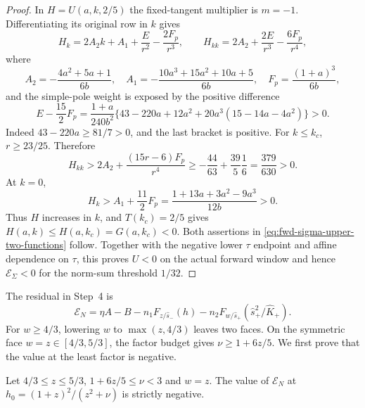 \begin{proof}
In $H=U(a,k,2/5)$ the fixed-tangent multiplier is $m=-1$.
Differentiating its original row in $k$ gives
\[
 H_k=2A_2k+A_1+\frac E{r^2}-\frac{2F_p}{r^3},\qquad
 H_{kk}=2A_2+\frac{2E}{r^3}-\frac{6F_p}{r^4},
\]
where
\[
 A_2=-\frac{4a^2+5a+1}{6b},\quad
 A_1=-\frac{10a^3+15a^2+10a+5}{6b},\quad
 F_p=\frac{(1+a)^3}{6b},
\]
and the simple-pole weight is exposed by the positive difference
\[
 E-\frac{15}2F_p
 =\frac{1+a}{240b^2}
   \{43-220a+12a^2+20a^3(15-14a-4a^2)\}>0.
\]
Indeed $43-220a\geq81/7>0$, and the last bracket is positive.
For $k\leq k_c$, $r\geq23/25$. Therefore
\[
 H_{kk}>2A_2+\frac{(15r-6)F_p}{r^4}
       \geq-\frac{44}{63}+\frac{39}5\frac16
       =\frac{379}{630}>0.
\]
At $k=0$,
\[
 H_k>A_1+\frac{11}2F_p
       =\frac{1+13a+3a^2-9a^3}{12b}>0.
\]
Thus $H$ increases in $k$, and $T(k_c)=2/5$ gives
$H(a,k)\leq H(a,k_c)=G(a,k_c)<0$.
Both assertions in \eqref{eq:fwd-sigma-upper-two-functions} follow.
Together with the negative lower $\tau$ endpoint and affine dependence
on $\tau$, this proves $U<0$ on the actual forward window and hence
$\mathcal E_\Sigma<0$ for the norm-sum threshold $1/32$.

\end{proof}


The residual in Step~4 is
\[
 \mathcal E_N=\eta A-B-n_1F_{z/\hat s_-}(h)
             -n_2F_{w/\hat s_+}(\hat s_+^2/\hat K_+).
\]
For $w\ge4/3$, lowering $w$ to $\max(z,4/3)$ leaves two faces.
On the symmetric face $w=z\in[4/3,5/3]$, the factor budget gives
$\nu\ge1+6z/5$. We first prove that the value at the least factor is negative.

\begin{lemma}\label{lem:fwd-neighbour-value}
Let $4/3\le z\le5/3$, $1+6z/5\le\nu<3$ and $w=z$.
The value of $\mathcal E_N$ at $h_0=(1+z)^2/(z^2+\nu)$ is strictly negative.
\end{lemma}

